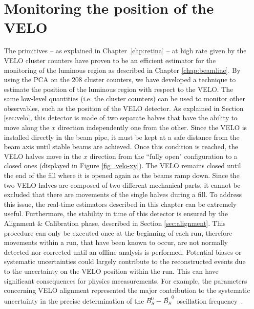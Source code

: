 \chapter{Monitoring the position of the VELO}
\label{chap:pos_VELO}
The primitives -- as explained in Chapter~\ref{chp:retina} -- at high rate given by the VELO cluster counters have proven to be an efficient estimator for the monitoring of the luminous region as described in Chapter \ref{chap:beamline}. By using the PCA on the 208 cluster counters, we have developed a technique to estimate the position of the luminous region with respect to the VELO. The same low-level quantities (i.e. the cluster counters) can be used to monitor other observables, such as the position of the VELO detector. As explained in Section \ref{sec:velo}, this detector is made of two separate halves that have the ability to move along the $x$ direction  independently one from the other. Since the VELO is installed directly in the beam pipe, it must be kept at a safe distance from the beam axis until stable beams are achieved. Once this condition is reached, the VELO halves move in the $x$ direction from the ``fully open" configuration to a closed ones (displayed in Figure \ref{fig_velo-xy}). The VELO remains closed until the end of the fill where it is opened again as the beams ramp down. Since the two VELO halves are composed of two different mechanical parts, it cannot be excluded that there are movements of the single halves during a fill. To address this issue, the real-time estimators described in this chapter can be extremely useful. 
Furthermore, the stability in time of this detector is ensured by the Alignment \& Calibration phase, described in Section \ref{sec:alignment}.  This procedure can only be executed once at the beginning of each run, therefore movements within a run, that have been known to occur, are not normally detected nor corrected until an offline analysis is performed. Potential biases or systematic uncertainties could largely contribute to the reconstructed events due to the uncertainty on the VELO position within the run. This can have significant consequences for physics meeasurements. For example, the parameters concerning VELO alignment represented the major contribution to the systematic uncertainty in the precise determination of the $B_S^0-\overline{B_S} ^0$ oscillation frequency~\cite{b0b0soscillation}.

